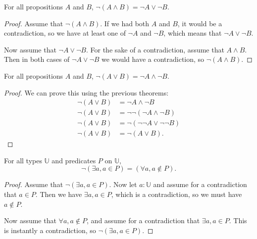 \documentclass[../../math.tex]{subfiles}
\begin{document}
\begin{theorem} \label{not_and}
    For all propositions $A$ and $B$, $\neg(A \wedge B) = \neg A \vee \neg B$.
\end{theorem}
\begin{proof}
    Assume that $\neg(A \wedge B)$.  If we had both $A$ and $B$, it would be a
    contradiction, so we have at least one of $\neg A$ and $\neg B$, which means
    that $\neg A \vee \neg B$.

    Now assume that $\neg A \vee \neg B$.  For the sake of a contradiction,
    assume that $A \wedge B$.  Then in both cases of $\neg A \vee \neg B$ we
    would have a contradiction, so $\neg(A \wedge B)$.
\end{proof}

\begin{theorem} \label{not_or}
    For all propositions $A$ and $B$, $\neg(A \vee B) = \neg A \wedge \neg B$.
\end{theorem}
\begin{proof}
    We can prove this using the previous theorems:
    \begin{align*}
        \neg(A \vee B) &= \neg A \wedge \neg B \\
        \neg(A \vee B) &= \neg \neg (\neg A \wedge \neg B) \\
        \neg(A \vee B) &= \neg (\neg \neg A \vee \neg \neg B) \\
        \neg(A \vee B) &= \neg (A \vee B).
    \end{align*}
\end{proof}

\begin{theorem}
    For all types $\mathbb U$ and predicates $P$ on $\mathbb U$,
    \[
        \neg(\exists a, a \in P) = (\forall a, a \notin P).
    \]
\end{theorem}
\begin{proof}
    Assume that $\neg(\exists a, a \in P)$.  Now let $a : \mathbb U$ and assume
    for a contradiction that $a \in P$.  Then we have $\exists a, a \in P$,
    which is a contradiction, so we must have $a \notin P$.

    Now assume that $\forall a, a \notin P$, and assume for a contradiction that
    $\exists a, a \in P$.  This is instantly a contradiction, so $\neg(\exists
    a, a \in P)$.
\end{proof}
\end{document}
